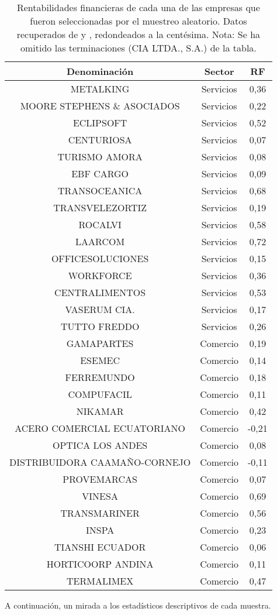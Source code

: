 \documentclass[12pt,a4paper,twoside]{article}
\begin{document}
\begin{table}[H]
\begin{center}
\begin{tabular}{|c|c|c|} \hline 
  \textbf{Denominación} & \textbf{Sector} & \textbf{RF} \\ \hline
 METALKING & Servicios & 0,36 \\ 
  MOORE STEPHENS \& ASOCIADOS & Servicios & 0,22 \\ 
  ECLIPSOFT & Servicios &  0,52 \\ 
  CENTURIOSA & Servicios & 0,07 \\ 
  TURISMO AMORA & Servicios & 0,08 \\ 
  EBF CARGO & Servicios & 0,09 \\ 
  TRANSOCEANICA & Servicios & 0,68 \\ 
  TRANSVELEZORTIZ & Servicios & 0,19 \\ 
  ROCALVI & Servicios & 0,58 \\ 
  LAARCOM & Servicios & 0,72 \\ 
  OFFICESOLUCIONES & Servicios & 0,15 \\ 
  WORKFORCE & Servicios & 0,36 \\ 
  CENTRALIMENTOS & Servicios & 0,53 \\ 
  VASERUM CIA. & Servicios & 0,17 \\ 
  TUTTO FREDDO & Servicios & 0,26 \\
  GAMAPARTES & Comercio & 0,19 \\ 
  ESEMEC & Comercio & 0,14 \\ 
  FERREMUNDO & Comercio & 0,18 \\  
  COMPUFACIL & Comercio & 0,11 \\  
  NIKAMAR & Comercio & 0,42 \\ 
  ACERO COMERCIAL ECUATORIANO & Comercio & -0,21 \\    
  OPTICA LOS ANDES & Comercio & 0,08 \\ 
  DISTRIBUIDORA CAAMAÑO-CORNEJO & Comercio & -0,11 \\  
  PROVEMARCAS & Comercio & 0,07 \\ 
  VINESA & Comercio & 0,69 \\ 
  TRANSMARINER & Comercio & 0,56 \\  
  INSPA & Comercio &  0,23 \\ 
  TIANSHI ECUADOR & Comercio &  0,06 \\ 
  HORTICOORP ANDINA & Comercio & 0,11 \\
  TERMALIMEX & Comercio & 0,47 \\ 
    \hline
  \end{tabular} 
  \end{center}
\label{tab:tablarent}
\caption[Rentabilidades financieras de empresas muestreadas]{Rentabilidades financieras de cada una de las empresas que fueron seleccionadas por el muestreo aleatorio. Datos recuperados de \cite{indicadoresupercias} y \cite{guiaderevistaekos}, redondeados a la centésima. Nota: Se ha omitido las terminaciones (CIA LTDA., S.A.) de la tabla.}
\end{table}
A continuación, un mirada a los estadísticos descriptivos de cada muestra.
\end{document}
